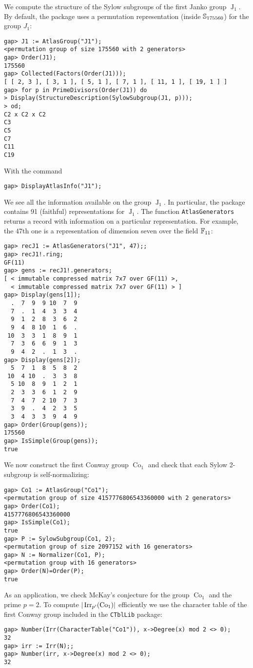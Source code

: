 \begin{example}
We compute the structure
of the Sylow subgroups of the first Janko group $\operatorname{J}_1$. By default, 
the package uses a permutation representation (inside $\mathbb{S}_{175560}$) 
for the group $J_1$: 
\begin{lstlisting}
gap> J1 := AtlasGroup("J1");
<permutation group of size 175560 with 2 generators>
gap> Order(J1);
175560
gap> Collected(Factors(Order(J1)));
[ [ 2, 3 ], [ 3, 1 ], [ 5, 1 ], [ 7, 1 ], [ 11, 1 ], [ 19, 1 ] ]
gap> for p in PrimeDivisors(Order(J1)) do
> Display(StructureDescription(SylowSubgroup(J1, p)));
> od;
C2 x C2 x C2
C3
C5
C7
C11
C19
\end{lstlisting}
With the command
\begin{lstlisting}
gap> DisplayAtlasInfo("J1");
\end{lstlisting}
We see all the information available on the group
$\operatorname{J}_1$. In particular, 
the package contains 91 (faithful) representations 
for $\operatorname{J}_1$. The function
\lstinline{AtlasGenerators} returns
a record with information on a particular representation. 
For example, the 47th one is a representation
of dimension seven over the field $\mathbb{F}_{11}$: 
\begin{lstlisting}
gap> recJ1 := AtlasGenerators("J1", 47);;
gap> recJ1!.ring;
GF(11)
gap> gens := recJ1!.generators;
[ < immutable compressed matrix 7x7 over GF(11) >,
  < immutable compressed matrix 7x7 over GF(11) > ]
gap> Display(gens[1]);
  .  7  9  9 10  7  9
  7  .  1  4  3  3  4
  9  1  2  8  3  6  2
  9  4  8 10  1  6  .
 10  3  3  1  8  9  1
  7  3  6  6  9  1  3
  9  4  2  .  1  3  .
gap> Display(gens[2]);
  5  7  1  8  5  8  2
 10  4 10  .  3  3  8
  5 10  8  9  1  2  1
  2  3  3  6  1  2  9
  7  4  7  2 10  7  3
  3  9  .  4  2  3  5
  3  4  3  3  9  4  9
gap> Order(Group(gens));
175560
gap> IsSimple(Group(gens));
true
\end{lstlisting}
\end{example}

\begin{example}
    We now construct the first Conway group
    $\operatorname{Co}_1$ and check that 
    each Sylow 2-subgroup is self-normalizing:
\begin{lstlisting}
gap> Co1 := AtlasGroup("Co1");
<permutation group of size 4157776806543360000 with 2 generators>
gap> Order(Co1);
4157776806543360000
gap> IsSimple(Co1);
true
gap> P := SylowSubgroup(Co1, 2);
<permutation group of size 2097152 with 16 generators>
gap> N := Normalizer(Co1, P);
<permutation group with 16 generators>
gap> Order(N)=Order(P);
true
\end{lstlisting}
As an application, we check 
McKay's conjecture for the group $\operatorname{Co}_1$ 
and the prime $p=2$. To compute
$|\operatorname{Irr}_{p'}(\operatorname{Co}_1)|$ efficiently
we use the character table of 
the first Conway group
included in the \lstinline{CTblLib} package:

\begin{lstlisting}
gap> Number(Irr(CharacterTable("Co1")), x->Degree(x) mod 2 <> 0);
32
gap> irr := Irr(N);;
gap> Number(irr, x->Degree(x) mod 2 <> 0);
32
\end{lstlisting}
\end{example}

